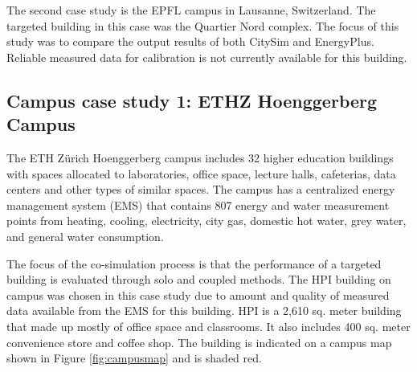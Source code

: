 \documentclass{tBPS2e}
\theoremstyle{plain}
\theoremstyle{definition}
\theoremstyle{remark}
\begin{document}
The second case study is the EPFL campus in Lausanne, Switzerland. The targeted building in this case was the Quartier Nord complex. The focus of this study was to compare the output results of both CitySim and EnergyPlus. Reliable measured data for calibration is not currently available for this building.

\subsection{Campus case study 1: ETHZ Hoenggerberg Campus}
The ETH Z\"urich Hoenggerberg campus includes 32 higher education buildings with spaces allocated to laboratories, office space, lecture halls, cafeterias, data centers and other types of similar spaces. The campus has a centralized energy management system (EMS) that contains 807 energy and water measurement points from heating, cooling, electricity, city gas, domestic hot water, grey water, and general water consumption. 



The focus of the co-simulation process is that the performance of a targeted building is evaluated through solo and coupled methods. The HPI building on campus was chosen in this case study due to amount and quality of measured data available from the EMS for this building. HPI is a 2,610 sq. meter building that made up mostly of office space and classrooms. It also includes 400 sq. meter convenience store and coffee shop. The building is indicated on a campus map shown in Figure \ref{fig:campusmap} and is shaded red.

\end{document}
